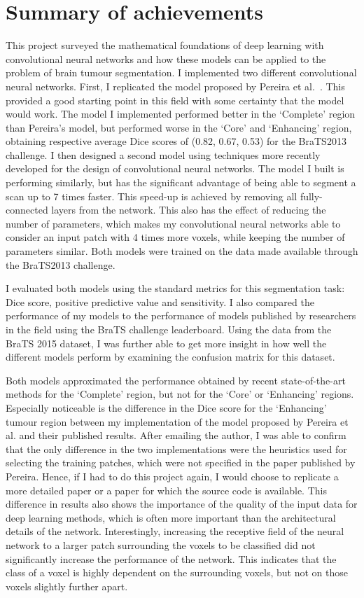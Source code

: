 \documentclass[12pt,a4paper,twoside,openright]{report}
\begin{document}
\section{Summary of achievements}
This project surveyed the mathematical foundations of deep learning with convolutional neural networks and how these models can be applied to the problem of brain tumour segmentation. I implemented two different convolutional neural networks. First, I replicated the model proposed by Pereira et al.\ \cite{pereira}. This provided a good starting point in this field with some certainty that the model would work. The model I implemented performed better in the `Complete' region than Pereira's model, but performed worse in the `Core' and `Enhancing' region, obtaining respective average Dice scores of (0.82, 0.67, 0.53) for the BraTS2013 \cite{brats-proceedings} challenge. I then designed a second model using techniques more recently developed for the design of convolutional neural networks. The model I built is performing similarly, but has the significant advantage of being able to segment a scan up to 7 times faster. This speed-up is achieved by removing all fully-connected layers from the network. This also has the effect of reducing the number of parameters, which makes my convolutional neural networks able to consider an input patch with 4 times more voxels, while keeping the number of parameters similar. Both models were trained on the data made available through the BraTS2013 challenge.

I evaluated both models using the standard metrics for this segmentation task: Dice score, positive predictive value and sensitivity. I also compared the performance of my models to the performance of models published by researchers in the field using the BraTS challenge leaderboard. Using the data from the BraTS 2015 dataset, I was further able to get more insight in how well the different models perform by examining the confusion matrix for this dataset.

Both models approximated the performance obtained by recent state-of-the-art methods for the `Complete' region, but not for the `Core' or `Enhancing' regions. Especially noticeable is the difference in the Dice score for the `Enhancing' tumour region between my implementation of the model proposed  by Pereira et al. and their published results. After emailing the author, I was able to confirm that the only difference in the two implementations were the heuristics used for selecting the training patches, which were not specified in the paper published by Pereira. Hence, if I had to do this project again, I would choose to replicate a more detailed paper or a paper for which the source code is available. This difference in results also shows the importance of the quality of the input data for deep learning methods, which is often more important than the architectural details of the network. Interestingly, increasing the receptive field of the neural network to a larger patch surrounding the voxels to be classified did not significantly increase the performance of the network. This indicates that the class of a voxel is highly dependent on the surrounding voxels, but not on those voxels slightly further apart.
\end{document}
